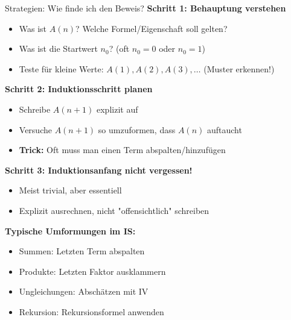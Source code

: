 \documentclass[a4paper, fontsize=7pt]{scrartcl}
\begin{document}
\begin{subbox}{Strategien: Wie finde ich den Beweis?}
\textbf{Schritt 1: Behauptung verstehen}
\begin{itemize}
  \item Was ist $A(n)$? Welche Formel/Eigenschaft soll gelten?
  \item Was ist die Startwert $n_0$? (oft $n_0 = 0$ oder $n_0 = 1$)
  \item Teste für kleine Werte: $A(1), A(2), A(3), \ldots$ (Muster erkennen!)
\end{itemize}

\textbf{Schritt 2: Induktionsschritt planen}
\begin{itemize}
  \item Schreibe $A(n+1)$ explizit auf
  \item Versuche $A(n+1)$ so umzuformen, dass $A(n)$ auftaucht
  \item \textbf{Trick:} Oft muss man einen Term abspalten/hinzufügen
\end{itemize}

\textbf{Schritt 3: Induktionsanfang nicht vergessen!}
\begin{itemize}
  \item Meist trivial, aber essentiell
  \item Explizit ausrechnen, nicht "offensichtlich" schreiben
\end{itemize}

\textbf{Typische Umformungen im IS:}
\begin{itemize}
  \item Summen: Letzten Term abspalten
  \item Produkte: Letzten Faktor ausklammern
  \item Ungleichungen: Abschätzen mit IV
  \item Rekursion: Rekursionsformel anwenden
\end{itemize}
\end{subbox}
\end{document}
